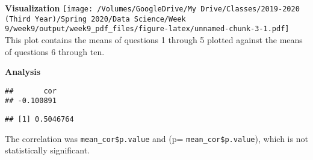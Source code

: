 \documentclass[
]{article}
\newenvironment{Shaded}{\begin{snugshade}}{\end{snugshade}}
\newcommand{\KeywordTok}[1]{\textcolor[rgb]{0.13,0.29,0.53}{\textbf{#1}}}
\newcommand{\NormalTok}[1]{#1}
\newcommand{\OperatorTok}[1]{\textcolor[rgb]{0.81,0.36,0.00}{\textbf{#1}}}
\newcommand{\StringTok}[1]{\textcolor[rgb]{0.31,0.60,0.02}{#1}}
\begin{document}
\textbf{Visualization}
\texttt{[image: /Volumes/GoogleDrive/My Drive/Classes/2019-2020 (Third Year)/Spring 2020/Data Science/Week 9/week9/output/week9\_pdf\_files/figure-latex/unnamed-chunk-3-1.pdf]}
This plot contains the means of questions 1 through 5 plotted against
the means of questions 6 through ten.

\textbf{Analysis}

\begin{Shaded}
\end{Shaded}

\begin{verbatim}
##       cor 
## -0.100891
\end{verbatim}

\begin{Shaded}
\end{Shaded}

\begin{verbatim}
## [1] 0.5046764
\end{verbatim}

The correlation was \texttt{mean\_cor\$p.value} and (p=
\texttt{mean\_cor\$p.value}), which is not statistically significant.
\end{document}
